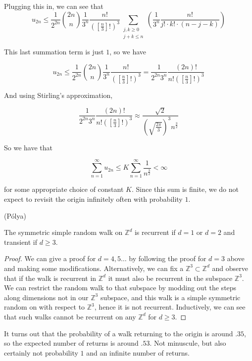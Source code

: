 Plugging this in, we can see that 
$$u_{2n}\leq \frac{1}{2^{2n}}\binom{2n}{n} \frac{1}{3^n}\frac{n!}{\left(\left[\frac{n}{3}\right]!\right)^3}\sum\limits_{\substack{j,k\geq 0 \\ j+k\leq n}}  \left(\frac{1}{3^n}\frac{n!}{j!\cdot k!\cdot (n-j-k)}\right)$$

This last summation term is just $1$, so we have

$$u_{2n}\leq \frac{1}{2^{2n}}\binom{2n}{n} \frac{1}{3^n}\frac{n!}{\left(\left[\frac{n}{3}\right]!\right)^3} = \frac{1}{2^{2n}3^n}\frac{(2n)!}{n!\left(\left[\frac{n}{3}\right]!\right)^3}$$

And using Stirling's approximation, 

$$\frac{1}{2^{2n}3^n}\frac{(2n)!}{n!\left(\left[\frac{n}{3}\right]!\right)^3} \approx \frac{\sqrt{2}}{\left(\sqrt{\frac{2\pi}{3}}\right)^3n^{\frac{3}{2}}}$$

So we have that 

$$\sum\limits_{n=1}^\infty u_{2n} \leq K\sum\limits_{n=1}^\infty \frac{1}{n^{\frac{3}{2}}} < \infty$$

for some appropriate choice of constant $K$.  Since this sum is finite, we do not expect to revisit the origin infinitely often with probability $1$.

\begin{theorem}(P\'olya)
	
	The symmetric simple random walk on $\mathbb{Z}^d$ is recurrent if $d=1$ or $d=2$ and transient if $d\geq 3$.
	
\end{theorem}

\begin{proof}
	We can give a proof for $d=4,5\dots$ by following the proof for $d=3$ above and making some modifications.  Alternatively, we can fix a $\mathbb{Z}^3 \subset \mathbb{Z}^d$ and observe that if the walk is recurrent in $\mathbb{Z}^d$ it must also be recurrent in the subspace $\mathbb{Z}^3$.  We can restrict the random walk to that subspace by modding out the steps along dimensions not in our $\mathbb{Z}^3$ subspace, and this walk is a simple symmetric random on with respect to $\mathbb{Z}^3$, hence it is not recurrent.  Inductively, we can see that such walks cannot be recurrent on any $\mathbb{Z}^d$ for $d\geq 3$.
\end{proof}

It turns out that the probability of a walk returning to the origin is around $.35$, so the expected number of returns is around $.53$.  Not minuscule, but also certainly not probability $1$ and an infinite number of returns.

